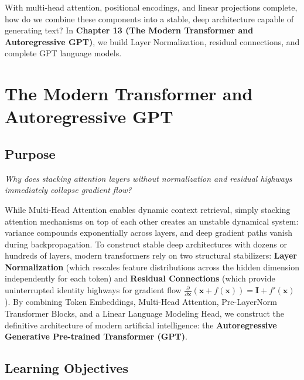 \documentclass[
  letterpaper,
]{scrbook}
\begin{document}
With multi-head attention, positional encodings, and linear projections
complete, how do we combine these components into a stable, deep
architecture capable of generating text? In \textbf{Chapter 13 (The
Modern Transformer and Autoregressive GPT)}, we build Layer
Normalization, residual connections, and complete GPT language models.

\chapter{The Modern Transformer and Autoregressive
GPT}\label{the-modern-transformer-and-autoregressive-gpt}

\section*{Purpose}\label{purpose-14}


\emph{Why does stacking attention layers without normalization and
residual highways immediately collapse gradient flow?}

While Multi-Head Attention enables dynamic context retrieval, simply
stacking attention mechanisms on top of each other creates an unstable
dynamical system: variance compounds exponentially across layers, and
deep gradient paths vanish during backpropagation. To construct stable
deep architectures with dozens or hundreds of layers, modern
transformers rely on two structural stabilizers: \textbf{Layer
Normalization} (which rescales feature distributions across the hidden
dimension independently for each token) and \textbf{Residual
Connections} (which provide uninterrupted identity highways for gradient
flow
\(\frac{\partial}{\partial \mathbf{x}}(\mathbf{x} + f(\mathbf{x})) = \mathbf{I} + f'(\mathbf{x})\)).
By combining Token Embeddings, Multi-Head Attention, Pre-LayerNorm
Transformer Blocks, and a Linear Language Modeling Head, we construct
the definitive architecture of modern artificial intelligence: the
\textbf{Autoregressive Generative Pre-trained Transformer (GPT)}.

\section{Learning Objectives}\label{learning-objectives-13}
\end{document}
